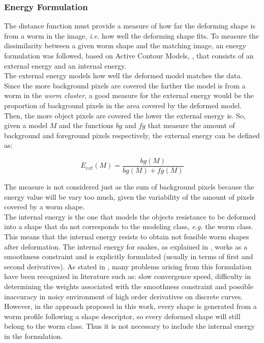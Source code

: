 \subsubsection*{Energy Formulation}
 
The distance function must provide a measure of how far the deforming shape is from a worm in the image, 
\emph{i.e.} how well
the deforming shape fits. To measure the dissimilarity between a given worm shape and the
matching image, an energy formulation was followed, based on Active Contour Models,
\cite{snakes}, that consists of an external energy and an internal energy.\\

The external energy models how well the deformed model matches the data. Since the more
background pixels are covered the farther the model is from a worm in the \emph{worm cluster}, a good measure for the external energy would be the proportion of background pixels in the 
area covered by the deformed model. Then, the more object pixels are covered the lower the 
external energy is. So, given a model $M$ and the functions $bg$ and $fg$  that measure
the amount of background and foreground pixels respectively, the external energy
can be defined as:

$$E_{ext}(M) = \frac{bg(M)}{bg(M)+fg(M)}$$

The measure is not considered just as the sum of background pixels
because the energy value will be vary too much, given the variability of the amount
of pixels covered by a worm shape.\\

The internal energy is the one that models the objects resistance to be deformed into
a shape that do not corresponds to the modeling class, \emph{e.g.} the worm class. 
This means that the internal energy resists to obtain not feasible worm
shapes after deformation. The internal energy for
snakes, as explained in \cite{snakes}, works as a smoothness constraint and is explicitly
formulated (usually in terms of first and second derivatives). As stated in \cite{bspline}, 
many problems arising from this formulation have been recognized in literature such as:
slow convergence speed, difficulty in determining the weights associated with the 
smoothness constraint and possible inaccuracy in noisy environment of high order derivatives on discrete curves.\\
However, in the approach proposed in this work, every shape is generated from a worm 
profile following a shape descriptor, so every deformed shape will still belong to the 
worm class. Thus it is not necessary to include the internal energy in the 
formulation.

